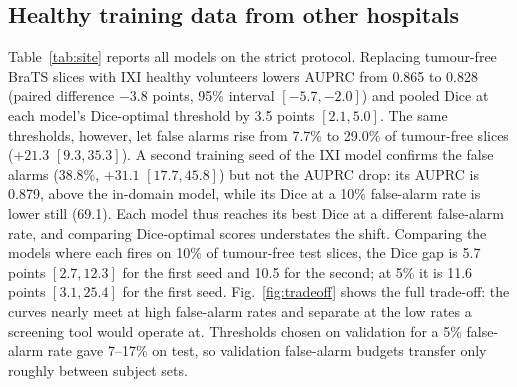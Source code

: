 \subsection{Healthy training data from other hospitals}
Table~\ref{tab:site} reports all models on the strict protocol.
Replacing tumour-free BraTS slices with IXI healthy volunteers lowers AUPRC from 0.865 to 0.828 (paired difference $-3.8$ points, 95\% interval $[-5.7, -2.0]$) and pooled Dice at each model's Dice-optimal threshold by 3.5 points $[2.1, 5.0]$.
The same thresholds, however, let false alarms rise from 7.7\% to 29.0\% of tumour-free slices ($+21.3$ $[9.3, 35.3]$).
A second training seed of the IXI model confirms the false alarms (38.8\%, $+31.1$ $[17.7, 45.8]$) but not the AUPRC drop: its AUPRC is 0.879, above the in-domain model, while its Dice at a 10\% false-alarm rate is lower still (69.1).
Each model thus reaches its best Dice at a different false-alarm rate, and comparing Dice-optimal scores understates the shift.
Comparing the models where each fires on 10\% of tumour-free test slices, the Dice gap is 5.7 points $[2.7, 12.3]$ for the first seed and 10.5 for the second; at 5\% it is 11.6 points $[3.1, 25.4]$ for the first seed.
Fig.~\ref{fig:tradeoff} shows the full trade-off: the curves nearly meet at high false-alarm rates and separate at the low rates a screening tool would operate at.
Thresholds chosen on validation for a 5\% false-alarm rate gave 7--17\% on test, so validation false-alarm budgets transfer only roughly between subject sets.

